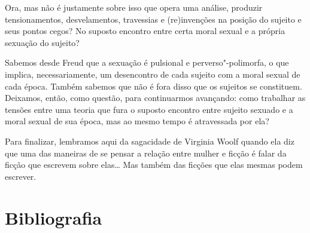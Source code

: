 Ora, mas não é justamente sobre isso que opera uma análise, produzir
tensionamentos, desvelamentos, travessias e (re)invenções na posição do
sujeito e seus pontos cegos? No suposto encontro entre certa moral
sexual e a própria sexuação do sujeito?

Sabemos desde Freud que a sexuação é pulsional e perverso"-polimorfa, o
que implica, necessariamente, um desencontro de cada sujeito com a moral
sexual de cada época. Também sabemos que não é fora disso que os
sujeitos se constituem. Deixamos, então, como questão, para continuarmos
avançando: como trabalhar as tensões entre uma teoria que fura o suposto
encontro entre sujeito sexuado e a moral sexual de sua época, mas ao
mesmo tempo é atravessada por ela?

Para finalizar, lembramos aqui da sagacidade de Virginia Woolf quando
ela diz que uma das maneiras de se pensar a relação entre mulher e
ficção é falar da ficção que escrevem sobre elas\ldots{} Mas também das
ficções que elas mesmas podem escrever.

\section{Bibliografia}

